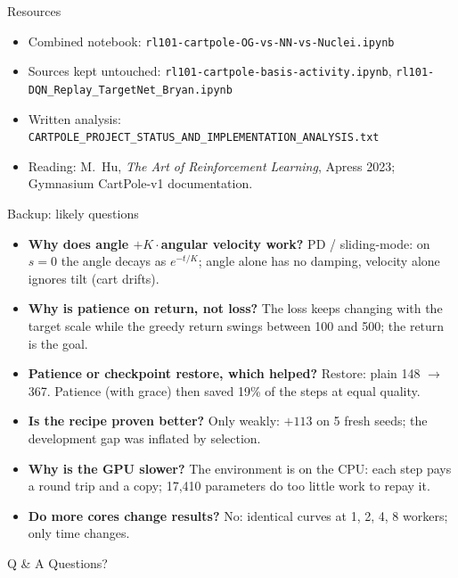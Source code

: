 \documentclass[aspectratio=169]{beamer}
\begin{document}
\begin{frame}{Resources}
\begin{itemize}
  \item Combined notebook:
  \texttt{rl101-cartpole-OG-vs-NN-vs-Nuclei.ipynb}

  \vspace{0.3cm}

  \item Sources kept untouched:
  \texttt{rl101-cartpole-basis-activity.ipynb}, \texttt{rl101-DQN\_Replay\_TargetNet\_Bryan.ipynb}

  \vspace{0.3cm}

  \item Written analysis: \texttt{CARTPOLE\_PROJECT\_STATUS\_AND\_IMPLEMENTATION\_ANALYSIS.txt}

  \vspace{0.3cm}

  \item Reading: M.~Hu, \emph{The Art of Reinforcement Learning}, Apress 2023; Gymnasium CartPole-v1 documentation.
\end{itemize}
\end{frame}

\begin{frame}{Backup: likely questions}
\scriptsize
\begin{itemize}
  \item \textbf{Why does angle $+K\cdot$angular velocity work?} PD / sliding-mode: on $s=0$ the angle decays as $e^{-t/K}$; angle alone has no damping, velocity alone ignores tilt (cart drifts).
  \item \textbf{Why is patience on return, not loss?} The loss keeps changing with the target scale while the greedy return swings between 100 and 500; the return is the goal.
  \item \textbf{Patience or checkpoint restore, which helped?} Restore: plain 148 $\to$ 367. Patience (with grace) then saved 19\% of the steps at equal quality.
  \item \textbf{Is the recipe proven better?} Only weakly: $+113$ on 5 fresh seeds; the development gap was inflated by selection.
  \item \textbf{Why is the GPU slower?} The environment is on the CPU: each step pays a round trip and a copy; 17,410 parameters do too little work to repay it.
  \item \textbf{Do more cores change results?} No: identical curves at 1, 2, 4, 8 workers; only time changes.
\end{itemize}
\end{frame}

\begin{frame}{Q \& A}
\centering
\Large Questions?
\end{frame}
\end{document}
